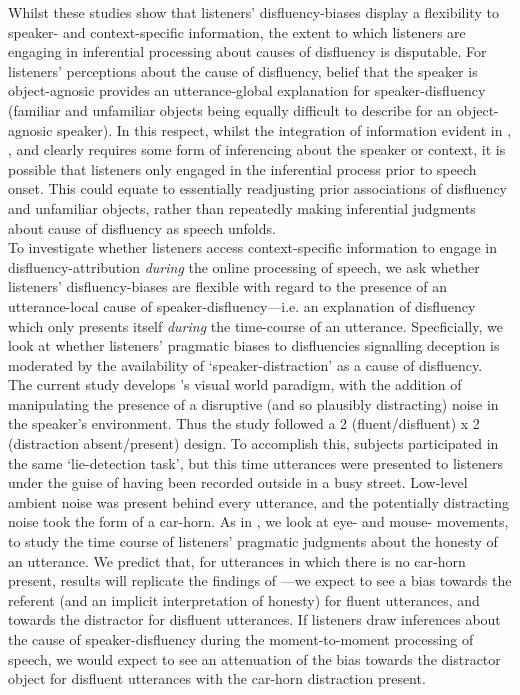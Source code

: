 \documentclass[man]{apa6}
\begin{document}
Whilst these studies show that listeners' disfluency-biases display a flexibility to speaker- and context-specific information, the extent to which listeners are engaging in inferential processing about causes of disfluency is disputable. 
For listeners' perceptions about the cause of disfluency, belief that the speaker is object-agnosic provides an utterance-global explanation for speaker-disfluency (familiar and unfamiliar objects being equally difficult to describe for an object-agnosic speaker). 
In this respect, whilst the integration of information evident in \citet{Arnold2007}, \citet{Barr2010}, and \citet{Heller2015} clearly requires some form of inferencing about the speaker or context, it is possible that listeners only engaged in the inferential process prior to speech onset. 
This could equate to essentially readjusting prior associations of disfluency and unfamiliar objects, rather than repeatedly making inferential judgments about cause of disfluency as speech unfolds.\\

To investigate whether listeners access context-specific information to engage in disfluency-attribution \textit{during} the online processing of speech, we ask whether listeners' disfluency-biases are flexible with regard to the presence of an utterance-local cause of speaker-disfluency---i.e. an explanation of disfluency which only presents itself \textit{during} the time-course of an utterance. 
Specficially, we look at whether listeners' pragmatic biases to disfluencies signalling deception \citep{Loy2016} is moderated by the availability of `speaker-distraction' as a cause of disfluency.\\

The current study develops \citet{Loy2016}'s visual world paradigm, with the addition of manipulating the presence of a disruptive (and so plausibly distracting) noise in the speaker's environment.
Thus the study followed a 2 (fluent/disfluent) x 2 (distraction absent/present) design.
To accomplish this, subjects participated in the same `lie-detection task', but this time utterances were presented to listeners under the guise of having been recorded outside in a busy street.
Low-level ambient noise was present behind every utterance, and the potentially distracting noise took the form of a car-horn. 
As in \citet{Loy2016}, we look at eye- and mouse- movements, to study the time course of listeners' pragmatic judgments about the honesty of an utterance. 
We predict that, for utterances in which there is no car-horn present, results will replicate the findings of \citet{Loy2016}---we expect to see a bias towards the referent (and an implicit interpretation of honesty) for fluent utterances, and towards the distractor for disfluent utterances. 
If listeners draw inferences about the cause of speaker-disfluency during the moment-to-moment processing of speech, we would expect to see an attenuation of the bias towards the distractor object for disfluent utterances with the car-horn distraction present.\\
\end{document}
